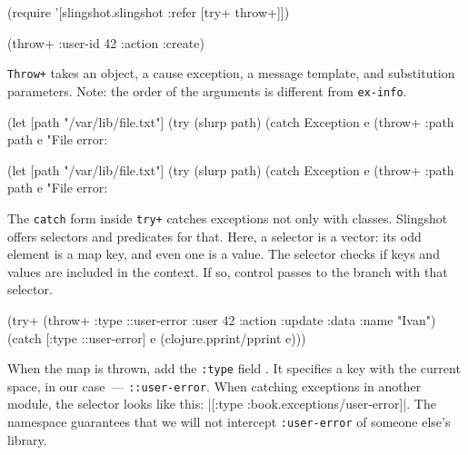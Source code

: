 \else

\begin{english}
  \begin{clojure}
(require '[slingshot.slingshot :refer [try+ throw+]])

(throw+ {:user-id 42 :action :create})
  \end{clojure}
\end{english}

\fi

\verb|Throw+| takes an object, a cause exception, a message template, and substitution parameters. Note: the order of the arguments is different from \verb|ex-info|.

\ifx\DEVICETYPE\MOBILE

\begin{english}
  \begin{clojure}
(let [path "/var/lib/file.txt"]
  (try
    (slurp path)
    (catch Exception e
      (throw+ {:path path} e
      "File error: %
  \end{clojure}
\end{english}

\else

\begin{english}
  \begin{clojure}
(let [path "/var/lib/file.txt"]
  (try
    (slurp path)
    (catch Exception e
      (throw+ {:path path} e "File error: %
  \end{clojure}
\end{english}

\fi


The \verb|catch| form inside \verb|try+| catches exceptions not only with classes. Slingshot offers selectors and predicates for that. Here, a selector is a vector: its odd element is a map key, and even one is a value. The selector checks if keys and values are included in the context. If so, control passes to the branch with that selector.

\begin{english}
  \begin{clojure/lines}
(try+
 (throw+ {:type ::user-error
          :user 42
          :action :update
          :data {:name "Ivan"}})
 (catch [:type ::user-error] e
   (clojure.pprint/pprint e)))
  \end{clojure/lines}
\end{english}

When the map is thrown, add the \verb|:type| field . It specifies a key with the current space, in our case~--- \verb|::user-error|.
When catching exceptions in another module, the selector looks like this: \spverb|[:type :book.exceptions/user-error]|. The namespace guarantees that we will not intercept \texttt{:user\--error} of someone else's library.

